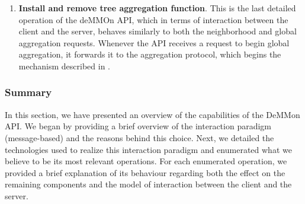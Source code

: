 \begin{enumerate}
    \item \textbf{Install and remove tree aggregation function}. This is the last detailed operation of the deMMOn API, which in terms of interaction between the client and the server, behaves similarly to both the neighborhood and global aggregation requests. Whenever the API receives a request to begin global aggregation, it forwards it to the aggregation protocol, which begins the mechanism described in .
\end{enumerate}


\subsubsection{Summary}

In this section, we have presented an overview of the capabilities of the DeMMon API. We began by providing a brief overview of the interaction paradigm (message-based) and the reasons behind this choice. Next, we detailed the technologies used to realize this interaction paradigm and enumerated what we believe to be its most relevant operations. For each enumerated operation, we provided a brief explanation of its behaviour regarding both the effect on the remaining components and the model of interaction between the client and the server. 